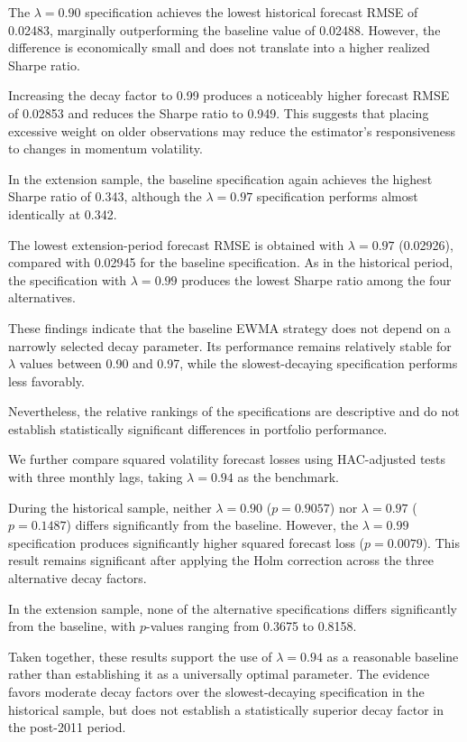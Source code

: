 \documentclass[11pt]{article}
\begin{document}
The $\lambda=0.90$ specification achieves
the lowest historical forecast RMSE of
0.02483, marginally outperforming the
baseline value of 0.02488. However, the
difference is economically small and
does not translate into a higher
realized Sharpe ratio.

Increasing the decay factor to 0.99
produces a noticeably higher forecast
RMSE of 0.02853 and reduces the Sharpe
ratio to 0.949. This suggests that
placing excessive weight on older
observations may reduce the estimator's
responsiveness to changes in momentum
volatility.

In the extension sample, the baseline
specification again achieves the highest
Sharpe ratio of 0.343, although the
$\lambda=0.97$ specification performs
almost identically at 0.342.

The lowest extension-period forecast
RMSE is obtained with $\lambda=0.97$
(0.02926), compared with 0.02945
for the baseline specification.
As in the historical period, the
specification with $\lambda=0.99$
produces the lowest Sharpe ratio
among the four alternatives.

These findings indicate that the
baseline EWMA strategy does not
depend on a narrowly selected
decay parameter. Its performance
remains relatively stable for
$\lambda$ values between 0.90
and 0.97, while the slowest-decaying
specification performs less favorably.

Nevertheless, the relative rankings
of the specifications are descriptive
and do not establish statistically
significant differences in portfolio
performance.


We further compare squared volatility forecast
losses using HAC-adjusted tests with three
monthly lags, taking $\lambda=0.94$ as the
benchmark.

During the historical sample, neither
$\lambda=0.90$ ($p=0.9057$) nor
$\lambda=0.97$ ($p=0.1487$) differs
significantly from the baseline.
However, the $\lambda=0.99$ specification
produces significantly higher squared
forecast loss ($p=0.0079$).
This result remains significant after
applying the Holm correction across the
three alternative decay factors.

In the extension sample, none of the
alternative specifications differs
significantly from the baseline,
with $p$-values ranging from 0.3675
to 0.8158.

Taken together, these results support
the use of $\lambda=0.94$ as a reasonable
baseline rather than establishing it
as a universally optimal parameter.
The evidence favors moderate decay
factors over the slowest-decaying
specification in the historical sample,
but does not establish a statistically
superior decay factor in the
post-2011 period.
\end{document}

